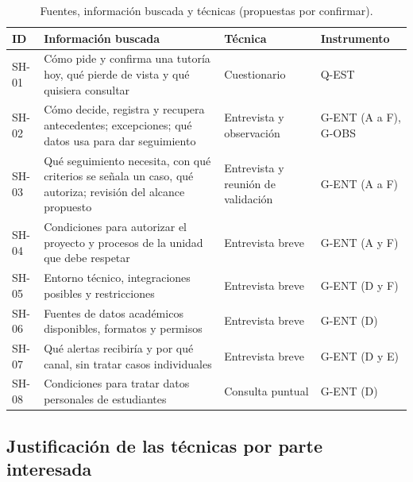 \documentclass[11pt,a4paper]{article}
\begin{document}
\begin{table}[ht]
\centering
\small
\caption{Fuentes, información buscada y técnicas (propuestas por confirmar).}
\label{tab:fuentes}
\begin{tabularx}{\textwidth}{
    |l
    |>{\raggedright\arraybackslash}X
    |>{\raggedright\arraybackslash}p{3.2cm}
    |>{\raggedright\arraybackslash}p{2.6cm}|
}
\hline
\textbf{ID} & \textbf{Información buscada} & \textbf{Técnica} & \textbf{Instrumento} \\ \hline
SH-01 & Cómo pide y confirma una tutoría hoy, qué pierde de vista y qué quisiera consultar & Cuestionario & Q-EST \\ \hline
SH-02 & Cómo decide, registra y recupera antecedentes; excepciones; qué datos usa para dar seguimiento & Entrevista y observación & G-ENT (A a F), G-OBS \\ \hline
SH-03 & Qué seguimiento necesita, con qué criterios se señala un caso, qué autoriza; revisión del alcance propuesto & Entrevista y reunión de validación & G-ENT (A a F) \\ \hline
SH-04 & Condiciones para autorizar el proyecto y procesos de la unidad que debe respetar & Entrevista breve & G-ENT (A y F) \\ \hline
SH-05 & Entorno técnico, integraciones posibles y restricciones & Entrevista breve & G-ENT (D y F) \\ \hline
SH-06 & Fuentes de datos académicos disponibles, formatos y permisos & Entrevista breve & G-ENT (D) \\ \hline
SH-07 & Qué alertas recibiría y por qué canal, sin tratar casos individuales & Entrevista breve & G-ENT (D y E) \\ \hline
SH-08 & Condiciones para tratar datos personales de estudiantes & Consulta puntual & G-ENT (D) \\ \hline
\end{tabularx}
\end{table}

\subsection{Justificación de las técnicas por parte interesada}
\end{document}
